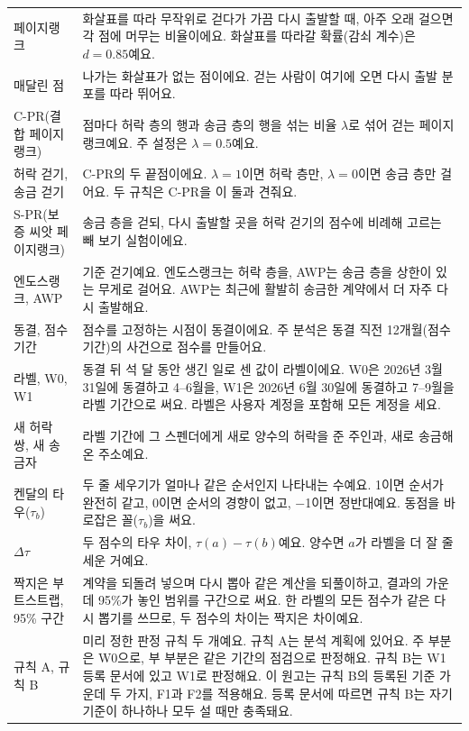 \documentclass[11pt]{article}
\begin{document}
{\begin{longtable}{@{}L{3.6cm}L{\dimexpr\linewidth-3.6cm-2\tabcolsep\relax}@{}}
페이지랭크 & 화살표를 따라 무작위로 걷다가 가끔 다시 출발할 때, 아주 오래 걸으면 각 점에 머무는 비율이에요. 화살표를 따라갈 확률(감쇠 계수)은 $d=0.85$예요. \\
매달린 점 & 나가는 화살표가 없는 점이에요. 걷는 사람이 여기에 오면 다시 출발 분포를 따라 뛰어요. \\
C-PR(결합 페이지랭크) & 점마다 허락 층의 행과 송금 층의 행을 섞는 비율 $\lambda$로 섞어 걷는 페이지랭크예요. 주 설정은 $\lambda=0.5$예요. \\
허락 걷기, 송금 걷기 & C-PR의 두 끝점이에요. $\lambda=1$이면 허락 층만, $\lambda=0$이면 송금 층만 걸어요. 두 규칙은 C-PR을 이 둘과 견줘요. \\
S-PR(보증 씨앗 페이지랭크) & 송금 층을 걷되, 다시 출발할 곳을 허락 걷기의 점수에 비례해 고르는 빼 보기 실험이에요. \\
엔도스랭크, AWP & 기준 걷기예요. 엔도스랭크는 허락 층을, AWP는 송금 층을 상한이 있는 무게로 걸어요. AWP는 최근에 활발히 송금한 계약에서 더 자주 다시 출발해요. \\
동결, 점수 기간 & 점수를 고정하는 시점이 동결이에요. 주 분석은 동결 직전 12개월(점수 기간)의 사건으로 점수를 만들어요. \\
라벨, W0, W1 & 동결 뒤 석 달 동안 생긴 일로 센 값이 라벨이에요. W0은 2026년 3월 31일에 동결하고 4–6월을, W1은 2026년 6월 30일에 동결하고 7–9월을 라벨 기간으로 써요. 라벨은 사용자 계정을 포함해 모든 계정을 세요. \\
새 허락 쌍, 새 송금자 & 라벨 기간에 그 스펜더에게 새로 양수의 허락을 준 주인과, 새로 송금해 온 주소예요. \\
켄달의 타우($\tau_b$) & 두 줄 세우기가 얼마나 같은 순서인지 나타내는 수예요. 1이면 순서가 완전히 같고, 0이면 순서의 경향이 없고, −1이면 정반대예요. 동점을 바로잡은 꼴($\tau_b$)을 써요. \\
$\Delta\tau$ & 두 점수의 타우 차이, $\tau(a)-\tau(b)$예요. 양수면 $a$가 라벨을 더 잘 줄 세운 거예요. \\
짝지은 부트스트랩, 95\% 구간 & 계약을 되돌려 넣으며 다시 뽑아 같은 계산을 되풀이하고, 결과의 가운데 95\%가 놓인 범위를 구간으로 써요. 한 라벨의 모든 점수가 같은 다시 뽑기를 쓰므로, 두 점수의 차이는 짝지은 차이예요. \\
규칙 A, 규칙 B & 미리 정한 판정 규칙 두 개예요. 규칙 A는 분석 계획에 있어요. 주 부분은 W0으로, 부 부분은 같은 기간의 점검으로 판정해요. 규칙 B는 W1 등록 문서에 있고 W1로 판정해요. 이 원고는 규칙 B의 등록된 기준 가운데 두 가지, F1과 F2를 적용해요. 등록 문서에 따르면 규칙 B는 자기 기준이 하나하나 모두 설 때만 충족돼요. \\

\end{longtable}}
\end{document}

